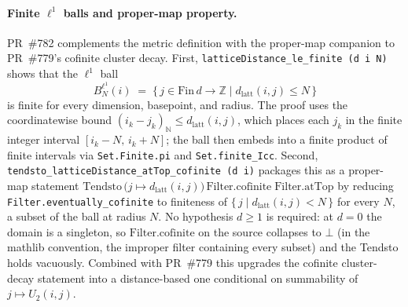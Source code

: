 \documentclass[a4paper,11pt]{article}
\begin{document}
\paragraph{Finite $\ell^1$ balls and proper-map property.}
PR~\#782 complements the metric definition with the proper-map
companion to PR~\#779's cofinite cluster decay. First,
\texttt{latticeDistance\_le\_finite (d i N)} shows that the
$\ell^1$ ball
\[
  B_N^{\ell^1}(i) \;=\; \{\, j \in \mathrm{Fin}\,d \to \mathbb Z
  \mid d_{\mathrm{latt}}(i, j) \le N \,\}
\]
is finite for every dimension, basepoint, and radius. The proof
uses the coordinatewise bound
$(i_k - j_k)_{\mathbb N} \le d_{\mathrm{latt}}(i, j)$, which places
each $j_k$ in the finite integer interval
$[i_k - N,\, i_k + N]$; the ball then embeds into a finite product
of finite intervals via \texttt{Set.Finite.pi} and
\texttt{Set.finite\_Icc}. Second,
\texttt{tendsto\_latticeDistance\_atTop\_cofinite (d i)} packages
this as a proper-map statement
$\mathrm{Tendsto}\,\bigl(j \mapsto d_{\mathrm{latt}}(i, j)\bigr)\,
\mathrm{Filter.cofinite}\; \mathrm{Filter.atTop}$
by reducing \texttt{Filter.eventually\_cofinite} to finiteness of
$\{\,j \mid d_{\mathrm{latt}}(i, j) < N\,\}$ for every $N$, a
subset of the ball at radius $N$. No hypothesis $d \ge 1$ is
required: at $d = 0$ the domain is a singleton, so
$\mathrm{Filter.cofinite}$ on the source collapses to $\bot$ (in
the mathlib convention, the improper filter containing every
subset) and the Tendsto holds vacuously. Combined with
PR~\#779 this upgrades the cofinite cluster-decay statement into
a distance-based one conditional on summability of
$j \mapsto U_2(i, j)$.
\end{document}
